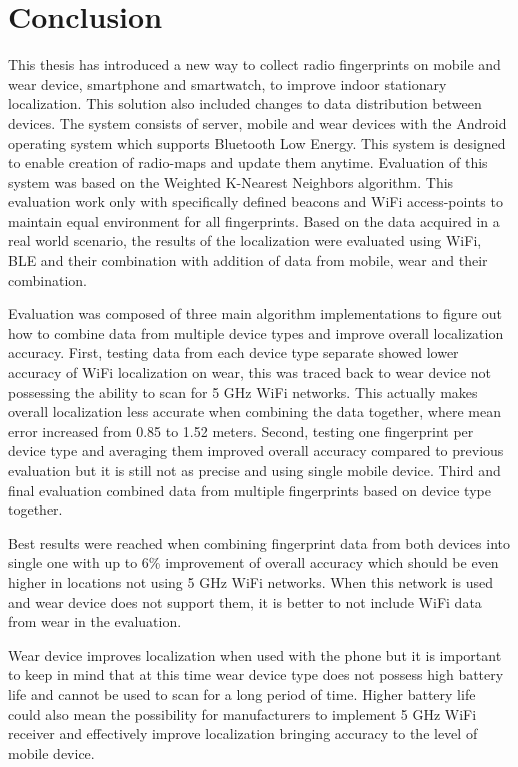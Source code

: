 \chapter{Conclusion}\label{sec:Conclusion}
This thesis has introduced a new way to collect radio fingerprints on mobile and wear device, smartphone and smartwatch, to improve indoor stationary localization. This solution also included changes to data distribution between devices. The system consists of server, mobile and wear devices with the Android operating system which supports Bluetooth Low Energy. This system is designed to enable creation of radio-maps and update them anytime. Evaluation of this system was based on the Weighted K-Nearest Neighbors algorithm. This evaluation work only with specifically defined beacons and WiFi access-points to maintain equal environment for all fingerprints. Based on the data acquired in a real world scenario, the results of the localization were evaluated using WiFi, BLE and their combination with addition of data from mobile, wear and their combination.

Evaluation was composed of three main algorithm implementations to figure out how to combine data from multiple device types and improve overall localization accuracy. First, testing data from each device type separate showed lower accuracy of WiFi localization on wear, this was traced back to wear device not possessing the ability to scan for 5 GHz WiFi networks. This actually makes overall localization less accurate when combining the data together, where mean error increased from 0.85 to 1.52 meters. Second, testing one fingerprint per device type and averaging them improved overall accuracy compared to previous evaluation but it is still not as precise and using single mobile device. Third and final evaluation combined data from multiple fingerprints based on device type together.

Best results were reached when combining fingerprint data from both devices into single one with up to 6\% improvement of overall accuracy which should be even higher in locations not using 5 GHz WiFi networks. When this network is used and wear device does not support them, it is better to not include WiFi data from wear in the evaluation.

Wear device improves localization when used with the phone but it is important to keep in mind that at this time wear device type does not possess high battery life and cannot be used to scan for a long period of time. Higher battery life could also mean the possibility for manufacturers to implement 5 GHz WiFi receiver and effectively improve localization bringing accuracy to the level of mobile device.

